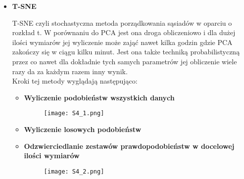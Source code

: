 \begin{itemize}
	\item \textbf{T-SNE}
	
	T-SNE czyli stochastyczna metoda porządkowania sąsiadów w oparciu o rozkład t. W porównaniu do PCA jest ona droga obliczeniowo i dla dużej ilości wymiarów jej wyliczenie może zająć nawet kilka godzin gdzie PCA zakończy się w ciągu kilku minut. Jest ona także techniką probabilistyczną przez co nawet dla dokładnie tych samych parametrów jej obliczenie wiele razy da za każdym razem inny wynik. \\
	
	Kroki tej metody wyglądają następująco:
	\begin{itemize}
		\item \textbf{Wyliczenie podobieństw wszystkich danych}
			\begin{figure}[H]
				\centering
				\texttt{[image: S4\_1.png]}
			\end{figure}
		\item \textbf{Wyliczenie losowych podobieństw}
		\item \textbf{Odzwierciedlanie zestawów prawdopodobieństw w docelowej ilości wymiarów}
			\begin{figure}[H]
				\centering
				\texttt{[image: S4\_2.png]}
			\end{figure}
	\end{itemize}
\end{itemize}
